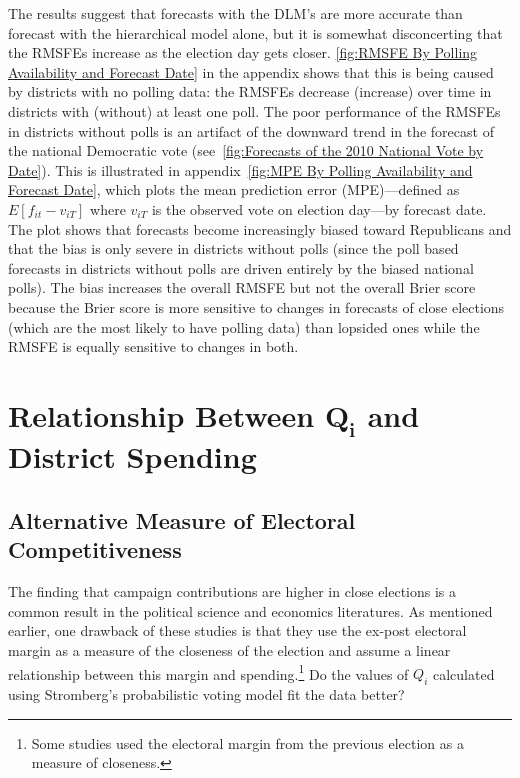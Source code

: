 \documentclass[12pt,final,fleqn]{article}
\theoremstyle{plain}
\begin{document}
The results suggest that forecasts with the DLM's are more accurate than forecast with the hierarchical model alone, but it is somewhat disconcerting that the RMSFEs increase as the election day gets closer. \autoref{fig:RMSFE By Polling Availability and Forecast Date} in the appendix shows that this is being caused by districts with no polling data: the RMSFEs decrease (increase) over time in districts with (without) at least one poll. The poor performance of the RMSFEs in districts without polls is an artifact of the downward trend in the forecast of the national Democratic vote (see~\autoref{fig:Forecasts of the 2010 National Vote by Date}). This is illustrated in appendix~\autoref{fig:MPE By Polling Availability and Forecast Date}, which plots the mean prediction error (MPE)---defined as $E[f_{it}-v_{iT}]$ where $v_{iT}$ is the observed vote on election day---by forecast date. The plot shows that forecasts become increasingly biased toward Republicans and that the bias is only severe in districts without polls (since the poll based forecasts in districts without polls are driven entirely by the biased national polls). The bias increases the overall RMSFE but not the overall Brier score because the Brier score is more sensitive to changes in forecasts of close elections (which are the most likely to have polling data) than lopsided ones while the RMSFE is equally sensitive to changes in both.

\section{Relationship Between $\mathbf{Q_i}$ and District Spending}
\subsection{Alternative Measure of Electoral Competitiveness}
The finding that campaign contributions are higher in close elections is a common result in the political science and economics literatures. As mentioned earlier, one drawback of these studies is that they use the ex-post electoral margin as a measure of the closeness of the election and assume a linear relationship between this margin and spending.\footnote{Some studies used the electoral margin from the previous election as a measure of closeness.} Do the values of $Q_i$ calculated using Stromberg's probabilistic voting model fit the data better?
\end{document}
